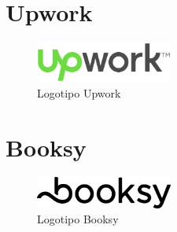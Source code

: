 \section{Upwork}
\begin{figure}[h]
	\centering
	\includegraphics[width = 0.4\textwidth]{Imagenes/Fuentes/logo_upwork.png}
	\caption{Logotipo Upwork}
	\label{fig:upwork_logo}
\end{figure}


\section{Booksy}
\begin{figure}[h]
	\centering
	\includegraphics[width = 0.4\textwidth]{Imagenes/Fuentes/logo_booksy.png}
	\caption{Logotipo Booksy}
	\label{fig:booksy_logo}
\end{figure}
